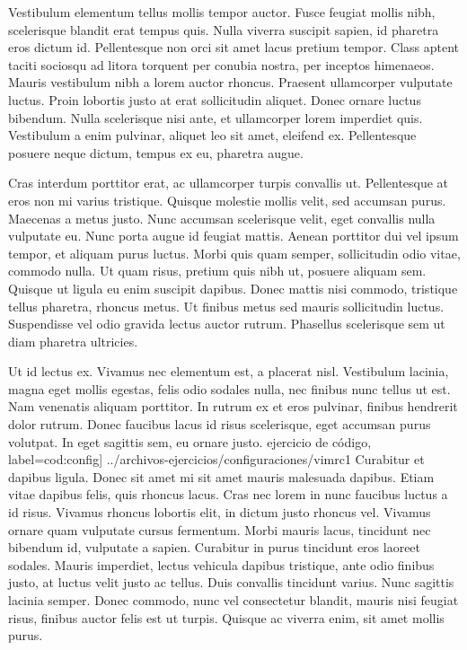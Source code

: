 Vestibulum elementum tellus mollis tempor auctor. Fusce feugiat mollis nibh, scelerisque blandit erat tempus quis. Nulla viverra suscipit sapien, id pharetra eros dictum id. Pellentesque non orci sit amet lacus pretium tempor. Class aptent taciti sociosqu ad litora torquent per conubia nostra, per inceptos himenaeos. Mauris vestibulum nibh a lorem auctor rhoncus. Praesent ullamcorper vulputate luctus. Proin lobortis justo at erat sollicitudin aliquet. Donec ornare luctus bibendum. Nulla scelerisque nisi ante, et ullamcorper lorem imperdiet quis. Vestibulum a enim pulvinar, aliquet leo sit amet, eleifend ex. Pellentesque posuere neque dictum, tempus ex eu, pharetra augue.

Cras interdum porttitor erat, ac ullamcorper turpis convallis ut. Pellentesque at eros non mi varius tristique. Quisque molestie mollis velit, sed accumsan purus. Maecenas a metus justo. Nunc accumsan scelerisque velit, eget convallis nulla vulputate eu. Nunc porta augue id feugiat mattis. Aenean porttitor dui vel ipsum tempor, et aliquam purus luctus. Morbi quis quam semper, sollicitudin odio vitae, commodo nulla. Ut quam risus, pretium quis nibh ut, posuere aliquam sem. Quisque ut ligula eu enim suscipit dapibus. Donec mattis nisi commodo, tristique tellus pharetra, rhoncus metus. Ut finibus metus sed mauris sollicitudin luctus. Suspendisse vel odio gravida lectus auctor rutrum. Phasellus scelerisque sem ut diam pharetra ultricies.

Ut id lectus ex. Vivamus nec elementum est, a placerat nisl. Vestibulum lacinia, magna eget mollis egestas, felis odio sodales nulla, nec finibus nunc tellus ut est. Nam venenatis aliquam porttitor. In rutrum ex et eros pulvinar, finibus hendrerit dolor rutrum. Donec faucibus lacus id risus scelerisque, eget accumsan purus volutpat. In eget sagittis sem, eu ornare justo.
\lstset{style=color2}
 ejercicio de código, label=cod:config] {../archivos-ejercicios/configuraciones/vimrc1}
Curabitur et dapibus ligula. Donec sit amet mi sit amet mauris malesuada dapibus. Etiam vitae dapibus felis, quis rhoncus lacus. Cras nec lorem in nunc faucibus luctus a id risus. Vivamus rhoncus lobortis elit, in dictum justo rhoncus vel. Vivamus ornare quam vulputate cursus fermentum. Morbi mauris lacus, tincidunt nec bibendum id, vulputate a sapien. Curabitur in purus tincidunt eros laoreet sodales. Mauris imperdiet, lectus vehicula dapibus tristique, ante odio finibus justo, at luctus velit justo ac tellus. Duis convallis tincidunt varius. Nunc sagittis lacinia semper. Donec commodo, nunc vel consectetur blandit, mauris nisi feugiat risus, finibus auctor felis est ut turpis. Quisque ac viverra enim, sit amet mollis purus.


